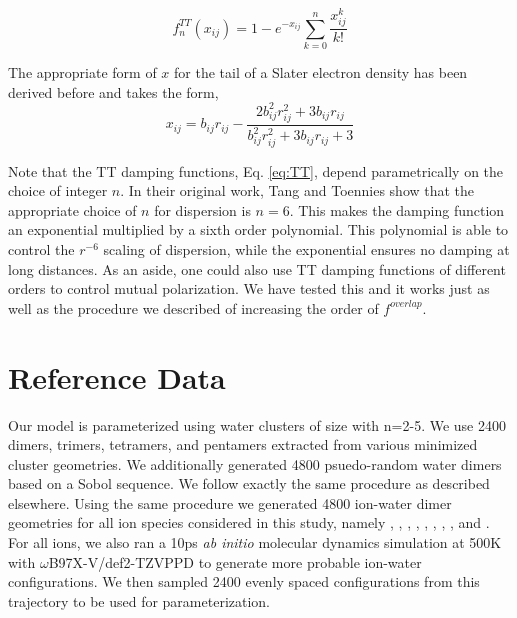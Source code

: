 \documentclass[journal=jacsat,manuscript=article]{achemso}
\begin{document}
\begin{equation}
  f_n^{TT}(x_{ij}) = 1-e^{-x_{ij}}\sum_{k=0}^n\frac{x_{ij}^k}{k!}
  \label{eq:TT}
\end{equation}

The appropriate form of $x$ for the tail of a Slater electron density
has been derived before\cite{van2016beyond} and takes the form,
\begin{equation}
  x_{ij}=b_{ij}r_{ij}-\frac{2b_{ij}^2r_{ij}^2+3b_{ij}r_{ij}}{b_{ij}^2r_{ij}^2+3b_{ij}r_{ij}+3}
  \label{eq:TT_x}
\end{equation}

Note that the TT damping functions, Eq. \ref{eq:TT}, depend parametrically on
the choice of integer $n$. In their original work, Tang and Toennies show that the appropriate choice
of $n$ for dispersion is $n=6$. This makes the damping function an exponential multiplied by a sixth order polynomial.
This polynomial is able to control the $r^{-6}$ scaling of dispersion, while the exponential ensures no
damping at long distances. As an aside, one could also use TT damping functions of different orders to control
mutual polarization. We have tested this and it works just as well as the procedure we
described of increasing the order of $f^{overlap}$.

\section*{Reference Data}

Our model is parameterized using water clusters of size  with n=2-5.
We use 2400 dimers, trimers, tetramers, and pentamers extracted from various minimized
cluster geometries. We additionally generated 4800 psuedo-random water dimers
based on a Sobol sequence. We follow exactly the same procedure as described elsewhere.\cite{misquitta2008first}
Using the same procedure we generated 4800 ion-water dimer geometries for all ion species considered in this study,
namely , , , , , , , , and .
For all ions, we also ran a 10ps \textit{ab initio} molecular dynamics simulation
at 500K with $\omega$B97X-V/def2-TZVPPD to generate more probable ion-water configurations. We then sampled 2400 evenly spaced
configurations from this trajectory to be used for parameterization.
\end{document}

